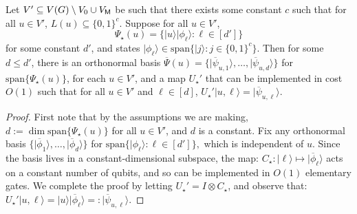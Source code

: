 \documentclass{theoretics}
\def\ket#1{{\lvert}#1\rangle}
\renewcommand{\>}{\rangle}
\newcommand{\<}{\langle}
\renewcommand{\(}{\left(}
\renewcommand{\)}{\right)}
\begin{document}
\begin{lemma}\label{lem:const-stars}
Let $V'\subseteq V(G)\setminus V_0\cup V_{\sf M}$ be such that there exists some constant $c$ such that for all $u\in V'$, $L(u)\subseteq \{0,1\}^c$. Suppose for all $u\in V'$, 
$$\Psi_\star(u)=\{\ket{u}\ket{\phi_\ell}:\ell\in [d']\}$$
for some constant $d'$, and states $\ket{\phi_{\ell}}\in \mathrm{span}\{\ket{j}:j\in \{0,1\}^c\}$. 
Then for some $d\leq d'$, there is an orthonormal basis $\overline{\Psi}(u)=\{\ket{\overline{\psi}_{u,1}},\dots,\ket{\overline{\psi}_{u,d}}\}$ for $\mathrm{span}\{\Psi_\star(u)\}$, for each $u\in V'$, and a map $U_\star'$ that can be implemented in cost $O(1)$ such that for all $u\in V'$ and $\ell\in[d]$, $U_\star'\ket{u,\ell}=\ket{\overline{\psi}_{u,\ell}}$. 
\end{lemma}
\begin{proof}
First note that by the assumptions we are making, $d:=\dim \mathrm{span}\{\Psi_\star(u)\}$ for all $u\in V'$, and $d$ is a constant. Fix any orthonormal basis 
$\{\ket{\overline{\phi}_1},\dots,\ket{\overline{\phi}_d}\}$ for 
$\mathrm{span}\{\ket{\phi_{\ell}}:\ell\in [d']\},$
which is independent of $u$. Since the basis lives in a constant-dimensional subspace, the map:
$C_\star:\ket{\ell}\mapsto \ket{\overline{\phi}_\ell}$
acts on a constant number of qubits, and so can be implemented in $O(1)$ elementary gates. We complete the proof by letting $U_\star'=I\otimes C_{\star}$, and observe that: $U_\star'\ket{u,\ell} = \ket{u}\ket{\overline{\phi}_\ell}=:\ket{\overline{\psi}_{u,\ell}}$.
\end{proof}
\end{document}
